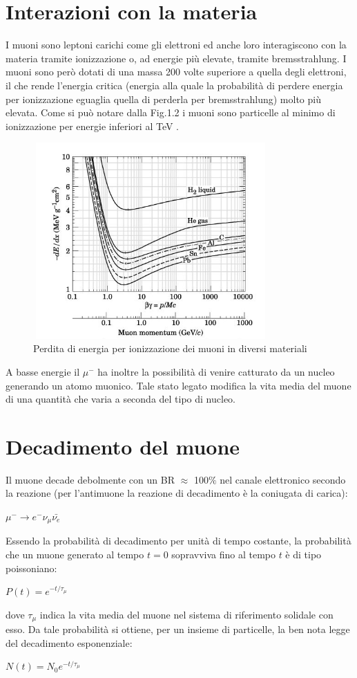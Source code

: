 \documentclass{standalone}
\begin{document}
\section{Interazioni con la materia}
I muoni sono leptoni carichi come gli elettroni ed anche loro interagiscono con la materia tramite ionizzazione o, ad energie pi\`u elevate, tramite bremsstrahlung.
I muoni sono per\`o dotati di una massa 200 volte superiore a quella degli elettroni, il che rende l'energia critica (energia alla quale la probabilit\`a di perdere energia per ionizzazione eguaglia quella di perderla per bremsstrahlung) molto pi\`u elevata.
Come si pu\`o notare dalla Fig.1.2 i muoni sono particelle al minimo di ionizzazione per energie inferiori al TeV \cite{Groom}.
\begin{figure}[H]
	\centering
	\includegraphics[width=9cm, height=7.5cm]{images/Energyloss.jpg}
	\caption{Perdita di energia per ionizzazione dei muoni in diversi materiali}
\end{figure}
A basse energie il ${\mu}^-$ ha inoltre la possibilit\`a di venire catturato da un nucleo generando un atomo muonico.
Tale stato legato modifica la vita media del muone di una quantit\`a che varia a seconda del tipo di nucleo.
\section{Decadimento del muone}
Il muone decade debolmente con un BR $\approx$ 100$\%$ nel canale elettronico secondo la reazione (per l'antimuone la reazione di decadimento \`e la coniugata di carica):\\
\centerline{$\mu^- \rightarrow e^- \nu_\mu \bar{\nu_e}$}
Essendo la probabilit\`a di decadimento per unit\`a di tempo costante, la probabilit\`a che un muone generato al tempo $t=0$ sopravviva fino al tempo $t$ \`e di tipo poissoniano:\\
\centerline{$P(t)=e^{-t/\tau_\mu}$}
dove $\tau_\mu$ indica la vita media del muone nel sistema di riferimento solidale con esso.
Da tale probabilit\`a si ottiene, per un insieme di particelle, la ben nota legge del decadimento esponenziale: \cite{Bendiscioli} \\
\centerline{$N(t)=N_0e^{-t/\tau_\mu}$}
\end{document}
